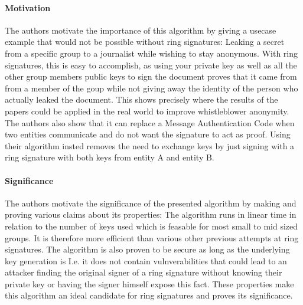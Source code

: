 \documentclass[11pt]{scrartcl}
\begin{document}
\paragraph{Motivation}{
The authors motivate the importance of this algorithm by giving a usecase example that would not be possible without ring signatures: Leaking a secret from a specific group to a journalist while wishing to stay anonymous. With ring signatures, this is easy to accomplish, as using your private key as well as all the other group members public keys to sign the document proves that it came from from a member of the goup while not giving away the identity of the person who actually leaked the document. This shows precisely where the results of the papers could be applied in the real world to improve whistleblower anonymity. The authors also show that it can replace a Message Authentication Code when two entities communicate and do not want the signature to act as proof. Using their algorithm insted removes the need to exchange keys by just signing with a ring signature with both keys from entity A and entity B.
}
\paragraph{Significance}{
The authors motivate the significance of the presented algorithm by making and proving various claims about its properties:
The algorithm runs in linear time in relation to the number of keys used which is feasable for most small to mid sized groups. It is therefore more efficient than various other previous attempts at ring signatures.
The algorithm is also proven to be secure as long as the underlying key generation is I.e. it does not contain vulnverabilities that could lead to an attacker finding the original signer of a ring signature without knowing their private key or having the signer himself expose this fact.
These properties make this algorithm an ideal candidate for ring signatures and proves its significance.
}
\end{document}
